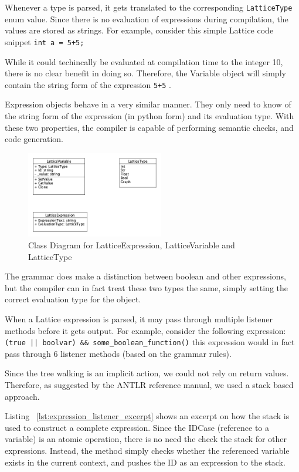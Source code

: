 Whenever a type is parsed, it gets translated to the corresponding \lstinline{LatticeType} enum value.
Since there is no evaluation of expressions during compilation, the values are stored as strings.
For example, consider this simple Lattice code snippet \lstinline{int a = 5+5;}

While it could techincally be evaluated at compilation time to the integer 10, there is no clear benefit in doing so.
Therefore, the Variable object will simply contain the string form of the expression \lstinline{5+5} .

Expression objects behave in a very similar manner.
They only need to know of the string form of the expression (in python form) and its evaluation type.
With these two properties, the compiler is capable of performing semantic checks, and code generation.

\begin{figure}[H]
    \centering
    \includegraphics[width=6cm]{figures/implementation_section/varexprtype}
    \caption{Class Diagram for LatticeExpression, LatticeVariable and LatticeType}
    \label{fig:exprs-vars-types}
\end{figure}

The grammar does make a distinction between boolean and other expressions, but the compiler can in fact
treat these two types the same, simply setting the correct evaluation type for the object.

When a Lattice expression is parsed, it may pass through multiple listener methods before it gets output.
For example, consider the following expression: \lstinline{(true || boolvar) && some_boolean_function()}
this expression would in fact pass through 6 listener methods (based on the grammar rules).

Since the tree walking is an implicit action, we could not rely on return values.
Therefore, as suggested by the ANTLR reference manual, we used a stack based approach.

Listing ~\ref{lst:expression_listener_excerpt} shows an excerpt on how the stack is used to construct a complete expression.
Since the IDCase (reference to a variable) is an atomic operation, there is no need the check the stack for other expressions.
Instead, the method simply checks whether the referenced variable exists in the current context, and pushes the
ID as an expression to the stack.

